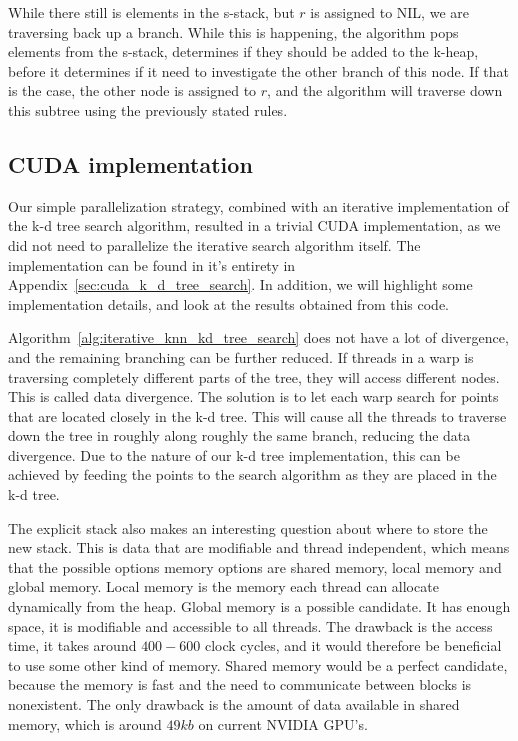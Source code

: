 While there still is elements in the s-stack, but $r$ is assigned to NIL, we are traversing back up a branch. While this is happening, the algorithm pops elements from the s-stack, determines if they should be added to the k-heap, before it determines if it need to investigate the other branch of this node. If that is the case, the other node is assigned to $r$, and the algorithm will traverse down this subtree using the previously stated rules.

\subsection{CUDA implementation} %
\label{sub:the_implementation}

Our simple parallelization strategy, combined with an iterative implementation of the k-d tree search algorithm, resulted in a trivial CUDA implementation, as we did not need to parallelize the iterative search algorithm itself. The implementation can be found in it's entirety in Appendix~\ref{sec:cuda_k_d_tree_search}. In addition, we will highlight some implementation details, and look at the results obtained from this code.

Algorithm~\ref{alg:iterative_knn_kd_tree_search} does not have a lot of divergence, and the remaining branching can be further reduced. If threads in a warp is traversing completely different parts of the tree, they will access different nodes. This is called data divergence. The solution is to let each warp search for points that are located closely in the k-d tree. This will cause all the threads to traverse down the tree in roughly along roughly the same branch, reducing the data divergence. Due to the nature of our k-d tree implementation, this can be achieved by feeding the points to the search algorithm as they are placed in the k-d tree.

The explicit stack also makes an interesting question about where to store the new stack. This is data that are modifiable and thread independent, which means that the possible options memory options are shared memory, local memory and global memory. Local memory is the memory each thread can allocate dynamically from the heap. Global memory is a possible candidate. It has enough space, it is modifiable and accessible to all threads. The drawback is the access time, it takes around $400-600$ clock cycles\cite{cuda_c_best_practices_guide}, and it would therefore be beneficial to use some other kind of memory. Shared memory would be a perfect candidate, because the memory is fast and the need to communicate between blocks is nonexistent. The only drawback is the amount of data available in shared memory, which is around $49 kb$ on current NVIDIA GPU's. 

